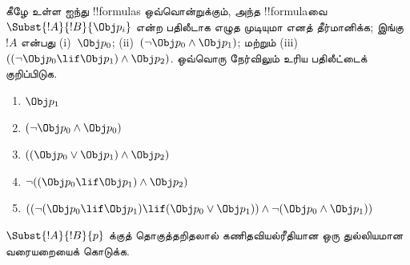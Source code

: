 \documentclass[../../../include/open-logic-section]{subfiles}
\begin{document}
\begin{prob} கீழே உள்ள ஐந்து !!{formula}s ஒவ்வொன்றுக்கும், அந்த
 !!{formula}வை \( \Subst{!A}{!B}{\Obj p_i} \) என்ற பதிலீடாக எழுத
 முடியுமா எனத் தீர்மானிக்க; இங்கு \( !A \) என்பது
 (i)~\( \Obj p_0 \); (ii)~\( ( \lnot \Obj p_0 \land \Obj
 p_1) \); மற்றும் (iii)~\( ( ( \lnot \Obj p_0 \lif \Obj p_1 ) \land \Obj
 p_2 ) \). ஒவ்வொரு நேர்விலும் உரிய பதிலீட்டைக் குறிப்பிடுக.
  \begin{enumerate}
    \item \( \Obj p_1 \)
    \item \( ( \lnot \Obj p_0 \land \Obj p_0 ) \)
    \item \( ( ( \Obj p_0 \lor \Obj p_1 ) \land \Obj p_2 )  \)
    \item \( \lnot ( ( \Obj p_0 \lif \Obj p_1 ) \land \Obj p_2 ) \)
    \item \( (( \lnot ( \Obj p_0 \lif \Obj p_1 ) \lif ( \Obj p_0 \lor \Obj p_1 )) \land \lnot ( \Obj p_0 \land \Obj p_1 )) \)
  \end{enumerate}
\end{prob}

\begin{prob}
$\Subst{!A}{!B}{p}$ க்குத் தொகுத்தறிதலால் கணிதவியல்ரீதியான ஒரு
துல்லியமான வரையறையைக் கொடுக்க.
\end{prob}
\end{document}
